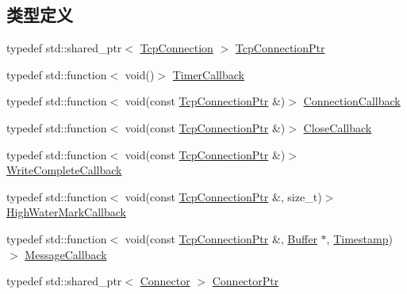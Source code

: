 \subsection*{类型定义}
\begin{DoxyCompactItemize}
\item 
typedef std\+::shared\+\_\+ptr$<$ \hyperlink{classmuduo_1_1net_1_1TcpConnection}{Tcp\+Connection} $>$ \hyperlink{namespacemuduo_1_1net_ab91a46e9290926aa692450e46cfc9039}{Tcp\+Connection\+Ptr}
\item 
typedef std\+::function$<$ void()$>$ \hyperlink{namespacemuduo_1_1net_ad4bd8788fd4c609b90c78920572bec50}{Timer\+Callback}
\item 
typedef std\+::function$<$ void(const \hyperlink{namespacemuduo_1_1net_ab91a46e9290926aa692450e46cfc9039}{Tcp\+Connection\+Ptr} \&)$>$ \hyperlink{namespacemuduo_1_1net_a78754792e997a13cb10908eb7ec508b2}{Connection\+Callback}
\item 
typedef std\+::function$<$ void(const \hyperlink{namespacemuduo_1_1net_ab91a46e9290926aa692450e46cfc9039}{Tcp\+Connection\+Ptr} \&)$>$ \hyperlink{namespacemuduo_1_1net_a5a393be65a093bad5f5a6b8340ce8c88}{Close\+Callback}
\item 
typedef std\+::function$<$ void(const \hyperlink{namespacemuduo_1_1net_ab91a46e9290926aa692450e46cfc9039}{Tcp\+Connection\+Ptr} \&)$>$ \hyperlink{namespacemuduo_1_1net_a525c3730bfefb763975b035ebc88a63d}{Write\+Complete\+Callback}
\item 
typedef std\+::function$<$ void(const \hyperlink{namespacemuduo_1_1net_ab91a46e9290926aa692450e46cfc9039}{Tcp\+Connection\+Ptr} \&, size\+\_\+t)$>$ \hyperlink{namespacemuduo_1_1net_a503c5e91d2e84874e83e9a6cbfb4a47b}{High\+Water\+Mark\+Callback}
\item 
typedef std\+::function$<$ void(const \hyperlink{namespacemuduo_1_1net_ab91a46e9290926aa692450e46cfc9039}{Tcp\+Connection\+Ptr} \&, \hyperlink{classmuduo_1_1net_1_1Buffer}{Buffer} $\ast$, \hyperlink{classmuduo_1_1Timestamp}{Timestamp})$>$ \hyperlink{namespacemuduo_1_1net_acaa802028467a41738aeb49699e85285}{Message\+Callback}
\item 
typedef std\+::shared\+\_\+ptr$<$ \hyperlink{classmuduo_1_1Connector}{Connector} $>$ \hyperlink{namespacemuduo_1_1net_adaac8e7754cfd0ac9c5a680eec411eba}{Connector\+Ptr}
\end{DoxyCompactItemize}
